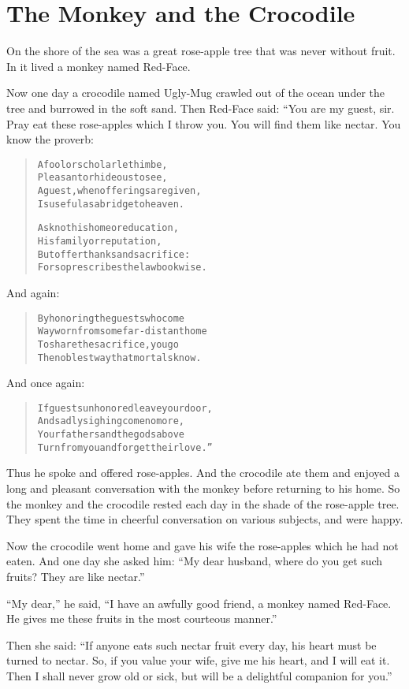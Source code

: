 \documentclass[article, twoside, 14pt]{memoir}
\renewenvironment{verbatim}{%
\begin{quote}%
\vskip -10pt%
\begin{alltt}\normalfont\large}{\end{alltt}%
\end{quote}%
\vskip -10pt
} %
\begin{document}
\chapter{The Monkey and the Crocodile}

\label{s66}

On the shore of the sea was a great rose-apple tree that was never
without fruit. In it lived a monkey named Red-Face.

Now one day a crocodile named Ugly-Mug crawled out of the ocean
under the tree and burrowed in the soft sand. Then Red-Face said:
“You are my guest, sir. Pray eat these rose-apples which I throw
you. You will find them like nectar. You know the proverb:

\begin{verbatim}
A fool or scholar let him be,
Pleasant or hideous to see,
A guest, when offerings are given,
Is useful as a bridge to heaven.

Ask not his home or education,
His family or reputation,
But offer thanks and sacrifice:
For so prescribes the lawbook wise.
\end{verbatim}
And again:

\begin{verbatim}
By honoring the guests who come
Wayworn from some far-distant home
To share the sacrifice, you go
The noblest way that mortals know.
\end{verbatim}
And once again:

\begin{verbatim}
If guests unhonored leave your door,
And sadly sighing come no more,
Your fathers and the gods above
Turn from you and forget their love.”
\end{verbatim}
Thus he spoke and offered rose-apples. And the crocodile ate them
and enjoyed a long and pleasant conversation with the monkey before
returning to his home. So the monkey and the crocodile rested each
day in the shade of the rose-apple tree. They spent the time in
cheerful conversation on various subjects, and were happy.

Now the crocodile went home and gave his wife the rose-apples which
he had not eaten. And one day she asked him:
``My dear husband, where do you get such fruits? They are like nectar.''

``My dear,'' he said,
``I have an awfully good friend, a monkey named Red-Face. He gives me these fruits in the most courteous manner.''

Then she said:
``If anyone eats such nectar fruit every day, his heart must be turned to nectar. So, if you value your wife, give me his heart, and I will eat it. Then I shall never grow old or sick, but will be a delightful companion for you.''
\end{document}
